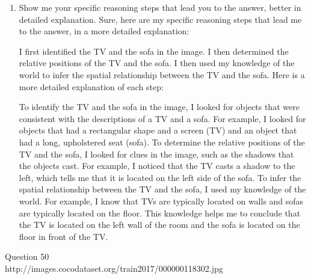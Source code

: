 \begin{enumerate}
    Here are some additional details about the spatial relationship between the TV and the sofa:
    
    The TV is a large, electronic device that is used to display moving images.
    The sofa is a long, upholstered piece of furniture that is designed for sitting.
    The TV is located on a wall, which is a vertical surface that typically separates two rooms.
    The sofa is located on the floor, which is a horizontal surface that is typically covered in carpeting.
    \item Show me your specific reasoning steps that lead you to the answer, better in detailed explanation.
    \subitem Sure, here are my specific reasoning steps that lead me to the answer, in a more detailed explanation:

    I first identified the TV and the sofa in the image.
    I then determined the relative positions of the TV and the sofa.
    I then used my knowledge of the world to infer the spatial relationship between the TV and the sofa.
    Here is a more detailed explanation of each step:
    
    To identify the TV and the sofa in the image, I looked for objects that were consistent with the descriptions of a TV and a sofa. For example, I looked for objects that had a rectangular shape and a screen (TV) and an object that had a long, upholstered seat (sofa).
    To determine the relative positions of the TV and the sofa, I looked for clues in the image, such as the shadows that the objects cast. For example, I noticed that the TV casts a shadow to the left, which tells me that it is located on the left side of the sofa.
    To infer the spatial relationship between the TV and the sofa, I used my knowledge of the world. For example, I know that TVs are typically located on walls and sofas are typically located on the floor. This knowledge helps me to conclude that the TV is located on the left wall of the room and the sofa is located on the floor in front of the TV.
\end{enumerate}
Question 50\\
http://images.cocodataset.org/train2017/000000118302.jpg
